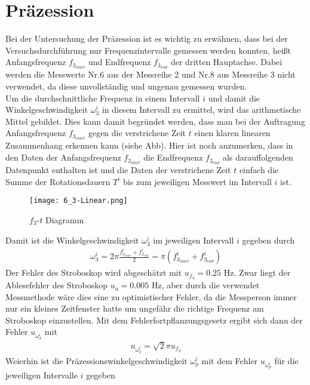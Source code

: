 

\section{Präzession}

Bei der Untersuchung der Präzession ist es wichtig zu erwähnen, dass bei der Versuchsdurchführung nur Frequenzintervalle gemessen werden konnten, heißt Anfangsfrequenz $f_{3_{start}}$ und Endfrequenz $f_{3_{end}}$ der dritten Hauptachse. Dabei werden die Messwerte Nr.6 aus der Messreihe 2 und Nr.8 aus Messreihe 3 nicht verwendet, da diese unvollständig und ungenau gemessen wurden. \\
Um die durchschnittliche Frequenz in einem Intervall $i$ und damit die Winkelgeschwindigkeit $\omega_3^i$ in diesem Intervall zu ermittel, wird das arithmetische Mittel gebildet. Dies kann damit begründet werden, dass man bei der Auftragung Anfangsfrequenz $f_{3_{start}}$ gegen die verstrichene Zeit $t$ einen klaren linearen Zusammenhang erkennen kann (siehe Abb). Hier ist noch anzumerken, dass in den Daten der Anfangsfrequenz $f_{3_{start}}$ die Endfrequenz $f_{3_{end}}$ als darauffolgenden Datenpunkt enthalten ist und die Daten der verstrichene Zeit $t$ einfach die Summe der Rotationsdauern $T^i$ bis zum jeweiligen Messwert im Intervall $i$ ist.
\begin{figure}[ht]
    \centering
    \caption{$f_3$-$t$ Diagramm}
    \texttt{[image: 6\_3-Linear.png]}
\end{figure}
Damit ist die Winkelgeschwindigkeit $\omega_3^i$ im jeweiligen Intervall $i$ gegeben durch 
\begin{align}
    \omega_3^i=2\pi\frac{f_{3_{start}}^i+f_{3_{end}}^i}{2}=\pi(f_{3_{start}}^i+f_{3_{end}}^i)
\end{align}
Der Fehler des Stroboskop wird abgeschätzt mit $u_{f_3} = 0.25$ Hz. Zwar liegt der Ablesefehler des Stroboskop $u_a = 0.005$ Hz, aber durch die verwendet Messmethode wäre dies eine zu optimistischer Fehler, da die Messperson immer nur ein kleines Zeitfenster hatte um ungefähr die richtige Frequenz am Stroboskop einzustellen. Mit dem Fehlerfortpflanzungsgesetz ergibt sich dann der Fehler $u_{\omega_3^i}$ mit
\begin{align}
    u_{\omega_3^i}=\sqrt{2}\pi u_{f_3}
\end{align}
Weierhin ist die Präzessionswinkelgeschwindigkeit $\omega_p^i$ mit dem Fehler $u_{\omega_p^i}$ für die jeweiligen Intervalle $i$ gegeben 
